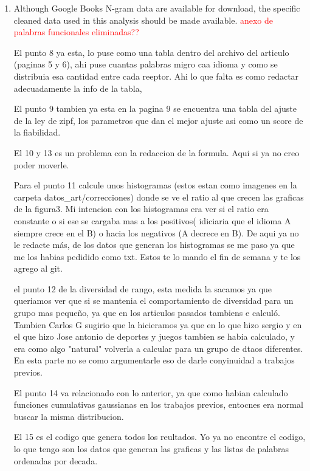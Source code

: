 \documentclass{article}
\begin{document}
\begin{enumerate}
\item  Although Google Books N-gram data are available for download, the
specific cleaned data used in this analysis should be made available. \textcolor{red}{anexo de palabras funcionales eliminadas??}




El punto 8 ya esta, lo puse como una tabla dentro del archivo del articulo (paginas 5 y 6), ahi puse cuantas palabras migro caa idioma y como se distribuia esa cantidad entre cada reeptor. Ahi lo que falta es como redactar adecuadamente la info de la tabla,

El punto 9 tambien ya esta en la pagina 9 se encuentra una tabla del ajuste de la ley de zipf, los parametros que dan el mejor ajuste asi como un score de la fiabilidad.

El 10 y 13 es un problema con la redaccion de la formula. Aqui si ya no creo poder moverle.

Para el punto 11 calcule unos histogramas (estos estan como imagenes en la
carpeta datos\_art/correcciones) donde se ve el ratio al que crecen las graficas
de la figura3. Mi intencion con los histogramas era ver si el ratio era
constante o si ese se cargaba mas a los positivos( idiciaria que el idioma A
siempre crece en el B) o hacia los negativos (A decrece en B). De aqui ya no le
redacte más, de los datos que generan los histogramas se me paso ya que me los
habias pedidido como txt. Estos te lo mando el fin de semana y te los agrego al
git.


el punto 12 de la diversidad de rango, esta medida la sacamos ya que queriamos ver que si se mantenia el comportamiento de diversidad para un grupo mas pequeño, ya que en los articulos pasados tambiens e calculó. Tambien Carlos G sugirio que la hicieramos ya que en lo que hizo sergio y en el que hizo Jose antonio de deportes y juegos tambien se habia calculado, y era como algo "natural" volverla a calcular para un grupo de dtaos diferentes. En esta parte no se como  argumentarle eso de darle conyinuidad a trabajos previos.

El punto 14 va relacionado con lo anterior, ya que como habian calculado funciones cumulativas gaussianas en los trabajos previos, entocnes era normal buscar la misma distribucion.

El 15 es el codigo que genera todos los reultados. Yo ya no encontre el codigo, lo que tengo son los datos que generan las graficas y las listas de palabras ordenadas por decada. 



\end{enumerate}
\end{document}
